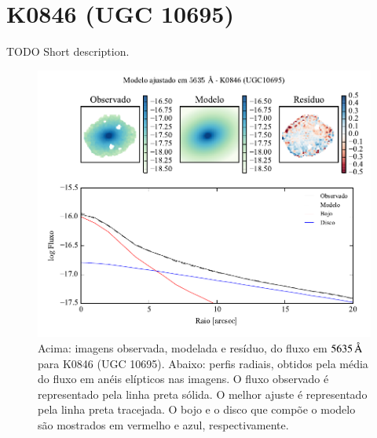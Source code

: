 
\section{K0846 (UGC 10695)}
\label{apendice:Decomp:K0846}

TODO Short description.

\begin{figure}
	\includegraphics[page=1]{figuras-decomp/K0846_sample006a}
	\caption[Ajuste morfológico em $5635\,\angstrom$ de K0846 (UGC 10695)]
	{Acima: imagens observada, modelada e resíduo, do fluxo em $5635\,\angstrom$
	para K0846 (UGC 10695). Abaixo: perfis radiais, obtidos pela média do fluxo em
	anéis elípticos nas imagens. O fluxo observado é representado pela linha preta
	sólida. O melhor ajuste é representado pela linha preta tracejada. O bojo e o
	disco que compõe o modelo são mostrados em vermelho e azul, respectivamente.}
	\label{fig:decompRadprof:K0846}
\end{figure}

